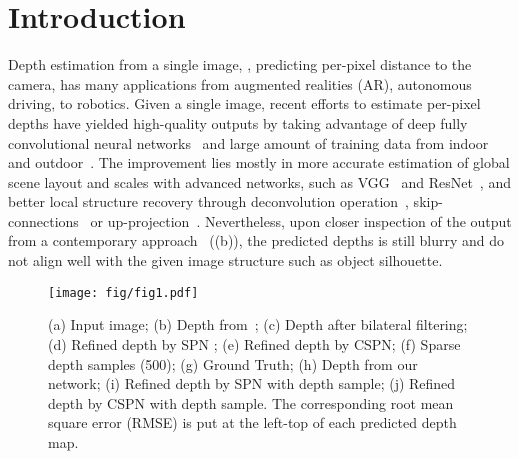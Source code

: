 \section{Introduction}
\label{sec:intro}
Depth estimation from a single image, \ie, predicting per-pixel distance to the camera,  has many applications from augmented realities (AR), autonomous driving,  to robotics.  
Given a single image, recent efforts to estimate per-pixel depths have yielded high-quality outputs by taking advantage of deep fully convolutional neural networks~\cite{eigen2015predicting,laina2016deeper} and large amount of training data from indoor~\cite{silberman2012indoor,xiao2013sun3d,Matterport3D} and outdoor~\cite{geiger2012we,wang2016torontocity,huang2018apolloscape}. 
The improvement lies mostly in more accurate estimation of global scene layout and scales with advanced networks, such as VGG~\cite{simonyan2014very} and ResNet~\cite{HeZRS15}, and better local structure recovery through deconvolution operation~\cite{long2015fully}, skip-connections~\cite{ronneberger2015u} or up-projection~\cite{laina2016deeper}. 
Nevertheless, upon closer inspection of the output from a contemporary approach~\cite{Ma2017SparseToDense} ((b)), the predicted depths is still blurry and do not align well with the given image structure such as object silhouette.

\begin{figure}[!htpb]
\centering
\texttt{[image: fig/fig1.pdf]}
\caption{(a) Input image; (b) Depth from~\cite{Ma2017SparseToDense}; (c) Depth after bilateral filtering; (d) Refined depth by SPN \cite{liu2017learning}; (e) Refined depth by CSPN; (f) Sparse depth samples (500); (g) Ground Truth; (h) Depth from our network; (i) Refined depth by SPN with depth sample; (j) Refined depth by CSPN with depth sample. The corresponding root mean square error (RMSE) is put at the left-top of each predicted depth map.}
\label{fig:example}
\end{figure}


